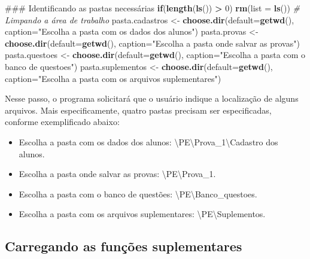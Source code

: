 \documentclass[a4paper]{report}
\newenvironment{Shaded}{\begin{snugshade}}{\end{snugshade}}
\newcommand{\KeywordTok}[1]{\textcolor[rgb]{0.13,0.29,0.53}{\textbf{#1}}}
\newcommand{\DataTypeTok}[1]{\textcolor[rgb]{0.13,0.29,0.53}{#1}}
\newcommand{\DecValTok}[1]{\textcolor[rgb]{0.00,0.00,0.81}{#1}}
\newcommand{\StringTok}[1]{\textcolor[rgb]{0.31,0.60,0.02}{#1}}
\newcommand{\CommentTok}[1]{\textcolor[rgb]{0.56,0.35,0.01}{\textit{#1}}}
\newcommand{\ControlFlowTok}[1]{\textcolor[rgb]{0.13,0.29,0.53}{\textbf{#1}}}
\newcommand{\OperatorTok}[1]{\textcolor[rgb]{0.81,0.36,0.00}{\textbf{#1}}}
\newcommand{\NormalTok}[1]{#1}
\providecommand{\tightlist}{%
  \setlength{\itemsep}{0pt}\setlength{\parskip}{0pt}}
\begin{document}
\begin{Shaded}
\begin{Highlighting}[]
\NormalTok{### Identificando as pastas necessárias}
\ControlFlowTok{if}\NormalTok{(}\KeywordTok{length}\NormalTok{(}\KeywordTok{ls}\NormalTok{()) }\OperatorTok{>}\StringTok{ }\DecValTok{0}\NormalTok{) }\KeywordTok{rm}\NormalTok{(}\DataTypeTok{list =} \KeywordTok{ls}\NormalTok{()) }\CommentTok{# Limpando a área de trabalho}
\NormalTok{pasta.cadastros <-}\StringTok{ }\KeywordTok{choose.dir}\NormalTok{(}\DataTypeTok{default=}\KeywordTok{getwd}\NormalTok{(), }
                              \DataTypeTok{caption=}\StringTok{"Escolha a pasta com os dados dos alunos"}\NormalTok{)}
\NormalTok{pasta.provas <-}\StringTok{ }\KeywordTok{choose.dir}\NormalTok{(}\DataTypeTok{default=}\KeywordTok{getwd}\NormalTok{(), }
                           \DataTypeTok{caption=}\StringTok{"Escolha a pasta onde salvar as provas"}\NormalTok{)}
\NormalTok{pasta.questoes <-}\StringTok{ }\KeywordTok{choose.dir}\NormalTok{(}\DataTypeTok{default=}\KeywordTok{getwd}\NormalTok{(), }
                             \DataTypeTok{caption=}\StringTok{"Escolha a pasta com o banco de questoes"}\NormalTok{)}
\NormalTok{pasta.suplementos <-}\StringTok{ }\KeywordTok{choose.dir}\NormalTok{(}\DataTypeTok{default=}\KeywordTok{getwd}\NormalTok{(), }
                              \DataTypeTok{caption=}\StringTok{"Escolha a pasta com os arquivos suplementares"}\NormalTok{)}
\end{Highlighting}
\end{Shaded}

Nesse passo, o programa solicitará que o usuário indique a localização
de alguns arquivos. Mais especificamente, quatro pastas precisam ser
especificadas, conforme exemplificado abaixo:

\begin{itemize}
\tightlist
\item
  Escolha a pasta com os dados dos alunos:
  \textbackslash{}PE\textbackslash{}Prova\_1\textbackslash{}Cadastro dos
  alunos.
\item
  Escolha a pasta onde salvar as provas:
  \textbackslash{}PE\textbackslash{}Prova\_1.
\item
  Escolha a pasta com o banco de questões:
  \textbackslash{}PE\textbackslash{}Banco\_questoes.
\item
  Escolha a pasta com os arquivos suplementares:
  \textbackslash{}PE\textbackslash{}Suplementos.
\end{itemize}

\subsection{Carregando as funções suplementares}
\end{document}
